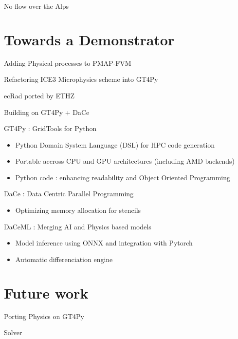 \documentclass{beamer}
\begin{document}
\begin{frame}{No flow over the Alps}
\end{frame}

\section{Towards a Demonstrator}

\begin{frame}{Adding Physical processes to PMAP-FVM}

\begin{block}{Refactoring ICE3 Microphysics scheme into GT4Py}
\end{block}

\begin{block}{}
\end{block}


ecRad ported by ETHZ
\end{frame}

\begin{frame}{Building on GT4Py + DaCe}

\begin{block}{GT4Py : GridTools for Python}
    \begin{itemize}
        \item Python Domain System Language (DSL) for HPC code generation
        \item Portable accross CPU and GPU architectures (including AMD backends)
        \item Python code : enhancing readability and Object Oriented Programming
    \end{itemize}    
\end{block}

\begin{block}{DaCe : Data Centric Parallel Programming}
    \begin{itemize}
        \item Optimizing memory allocation for stencils
    \end{itemize}
\end{block}

\begin{block}{DaCeML : Merging AI and Physics based models}
    \begin{itemize}
        \item Model inference using ONNX and integration with Pytorch
        \item Automatic differenciation engine
    \end{itemize}

\end{block}

\end{frame}


\section{Future work}
\begin{frame}{Porting Physics on GT4Py}


\end{frame}

\begin{frame}{Solver}
\end{frame}
\end{document}
